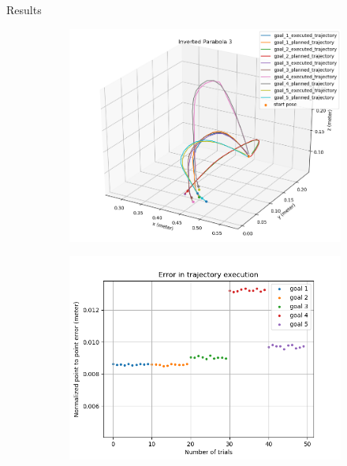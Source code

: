 \documentclass{beamer}
\begin{document}
	\begin{frame}{Results}
		\begin{figure}
			\begin{subfigure}[b]{0.49\linewidth}
				\includegraphics[scale=0.25]{images/1/inv_par_3.png}
			\end{subfigure}
			\begin{subfigure}[b]{0.49\linewidth}
				\includegraphics[scale=0.25]{images/1/inv_par_3_e.png}
			\end{subfigure}	
		\end{figure}
	\end{frame}
	
\end{document}
